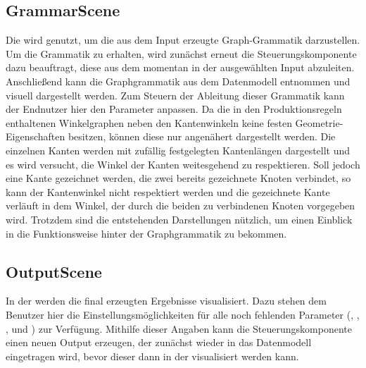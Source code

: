 \subsection{GrammarScene}
Die  wird genutzt, um die aus dem Input erzeugte Graph-Grammatik darzustellen. Um die Grammatik zu erhalten, wird
zunächst erneut die Steuerungskomponente dazu beauftragt, diese aus dem momentan in der  ausgewählten Input abzuleiten.
Anschließend kann die Graphgrammatik aus dem Datenmodell entnommen und visuell dargestellt werden. Zum Steuern der Ableitung dieser
Grammatik kann der Endnutzer hier den Parameter  anpassen. Da die in den
Produktionsregeln enthaltenen Winkelgraphen neben den Kantenwinkeln keine festen Geometrie-Eigenschaften besitzen, können diese nur
angenähert dargestellt werden. Die einzelnen Kanten werden mit zufällig festgelegten Kantenlängen dargestellt und es wird versucht, die
Winkel der Kanten weitesgehend zu respektieren. Soll jedoch eine Kante gezeichnet werden, die zwei bereits gezeichnete Knoten verbindet,
so kann der Kantenwinkel nicht respektiert werden und die gezeichnete Kante verläuft in dem Winkel, der durch die beiden zu verbindenen
Knoten vorgegeben wird. Trotzdem sind die entstehenden Darstellungen nützlich, um einen Einblick in die Funktionsweise hinter der
Graphgrammatik zu bekommen.

\subsection{OutputScene}
In der  werden die final erzeugten Ergebnisse visualisiert. Dazu stehen dem Benutzer hier die Einstellungsmöglichkeiten
für alle noch fehlenden Parameter (, , ,  und ) zur
Verfügung. Mithilfe dieser Angaben kann die Steuerungskomponente einen neuen Output erzeugen, der zunächst wieder in das Datenmodell
eingetragen wird, bevor dieser dann in der  visualisiert werden kann.
